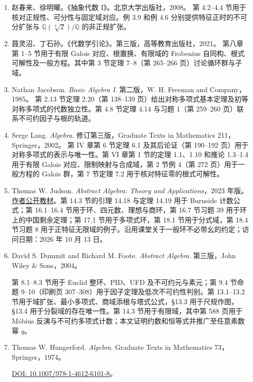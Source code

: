 \documentclass[lang=cn,a4paper,fontset=none,zihao=false,10pt,openany,twoside]{beautybook}
\numberwithin{algorithm}{chapter}
\begin{document}
\begin{enumerate}[(1)]
\item 赵春来、徐明曜。《抽象代数 I》。北京大学出版社，2008。
第 4.2--4.4 节用于核对正规性、可分性与固定域对应。例 3.9 和例 4.6 分别提供特征正时的不可分扩张与 $\mathbb Q(\sqrt[4]{2})/\mathbb Q$ 的非正规扩张。

\item 聂灵沼、丁石孙。《代数学引论》。第三版，高等教育出版社，2021。
第八章第 1--5 节用于有限 Galois 对应、根置换、有限域的 Frobenius 自同构、根式可解性及一般方程。其中第 3 节定理 7--8（第 265--266 页）讨论循环群与子域。

\item Nathan Jacobson. \emph{Basic Algebra I}. 第二版，W. H. Freeman and Company，1985。
第 2.13 节定理 2.20（第 138--139 页）给出对称多项式基本定理及初等对称多项式的代数独立性。第 4.8 节定理 4.14 与习题 1（第 259--260 页）联系不可约因子与根的轨道。

\item Serge Lang. \emph{Algebra}. 修订第三版，Graduate Texts in Mathematics 211，Springer，2002。
第 IV 章第 6 节定理 6.1 及其后论证（第 190--192 页）用于对称多项式的表示与唯一性。第 VI 章第 1 节的定理 1.1、1.10 和推论 1.3--1.4 用于有限 Galois 对应、限制映射与合成域，第 2 节例 4（第 272 页）用于一般方程的 Galois 群，第 7 节定理 7.2 用于核对特征零的根式可解性。

\item Thomas W. Judson. \emph{Abstract Algebra: Theory and Applications}，2023 年版。
\href{https://judsonbooks.org/aata-files/aata-20230811-print.pdf}{作者公开教材}。第 14.3 节的引理 14.18 与定理 14.19 用于 Burnside 计数公式；第 16.1--16.4 节用于环、四元数、理想与商环，第 16.7 节习题 39 用于环上的中国剩余定理；第 17.1 节用于多项式环，第 18.1 节用于分式域，第 18.4 节习题 8 用于正特征无限域的例子。沿用课堂关于一般环不必带幺的约定；访问日期：2026 年 10 月 13 日。
\item David S. Dummit and Richard M. Foote. \emph{Abstract Algebra}. 第三版，John Wiley \& Sons，2004。

第 8.1--8.3 节用于 Euclid 整环、PID、UFD 及不可约元与素元；第 9.4 节命题 9--10（印刷页 307--308）用于因子定理及低次不可约性判别。第 13.1--13.2 节用于域扩张、最小多项式、商域添根与塔式公式，§13.3 用于尺规作图，§13.4 用于分裂域的存在唯一性。第 14.3 节用于有限域，其中第 588 页用于 Möbius 反演与不可约多项式计数；本文证明约数和恒等式并推广至任意素数幂 $q$。

\item Thomas W. Hungerford. \emph{Algebra}. Graduate Texts in Mathematics 73，Springer，1974。\par\noindent\href{https://doi.org/10.1007/978-1-4612-6101-8}{DOI: 10.1007/978-1-4612-6101-8}。


\end{enumerate}
\end{document}
